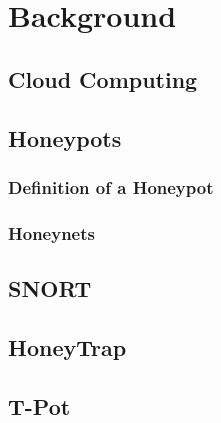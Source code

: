 \chapter{Background}

\section{Cloud Computing}

\section{Honeypots}

\subsection{Definition of a Honeypot}

\subsection{Honeynets}

\section{SNORT}

\section{HoneyTrap}

\section{T-Pot}